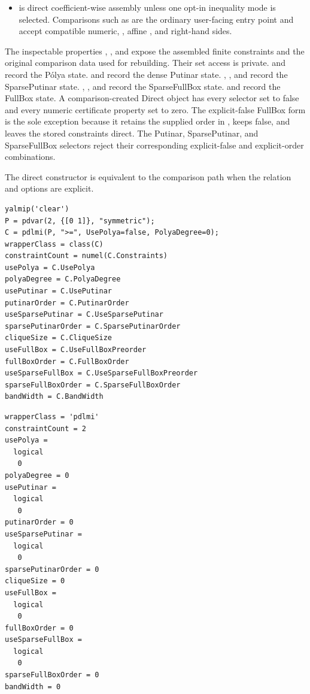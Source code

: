 \begin{itemize}[leftmargin=*]
  \item {} is direct coefficient-wise assembly unless one opt-in inequality mode is selected. Comparisons such as  are the ordinary user-facing entry point and accept compatible numeric, , affine , and  right-hand sides.
\end{itemize}

The inspectable properties , , and  expose the assembled finite constraints and the original comparison data used for rebuilding. Their set access is private.  and  record the P\'olya state.  and  record the dense Putinar state. , , and  record the SparsePutinar state. , , and  record the SparseFullBox state.  and  record the FullBox state. A comparison-created Direct object has every selector set to false and every numeric certificate property set to zero. The explicit-false FullBox form is the sole exception because it retains the supplied order in , keeps  false, and leaves the stored constraints direct. The Putinar, SparsePutinar, and SparseFullBox selectors reject their corresponding explicit-false and explicit-order combinations.

\examplehead
The direct constructor is equivalent to the comparison path when the relation and options are explicit.

\begin{lstlisting}[style=dpmatlab]
yalmip('clear')
P = pdvar(2, {[0 1]}, "symmetric");
C = pdlmi(P, ">=", UsePolya=false, PolyaDegree=0);
wrapperClass = class(C)
constraintCount = numel(C.Constraints)
usePolya = C.UsePolya
polyaDegree = C.PolyaDegree
usePutinar = C.UsePutinar
putinarOrder = C.PutinarOrder
useSparsePutinar = C.UseSparsePutinar
sparsePutinarOrder = C.SparsePutinarOrder
cliqueSize = C.CliqueSize
useFullBox = C.UseFullBoxPreorder
fullBoxOrder = C.FullBoxOrder
useSparseFullBox = C.UseSparseFullBoxPreorder
sparseFullBoxOrder = C.SparseFullBoxOrder
bandWidth = C.BandWidth
\end{lstlisting}

\begin{lstlisting}[style=dpoutput]
wrapperClass = 'pdlmi'
constraintCount = 2
usePolya =
  logical
   0
polyaDegree = 0
usePutinar =
  logical
   0
putinarOrder = 0
useSparsePutinar =
  logical
   0
sparsePutinarOrder = 0
cliqueSize = 0
useFullBox =
  logical
   0
fullBoxOrder = 0
useSparseFullBox =
  logical
   0
sparseFullBoxOrder = 0
bandWidth = 0
\end{lstlisting}

